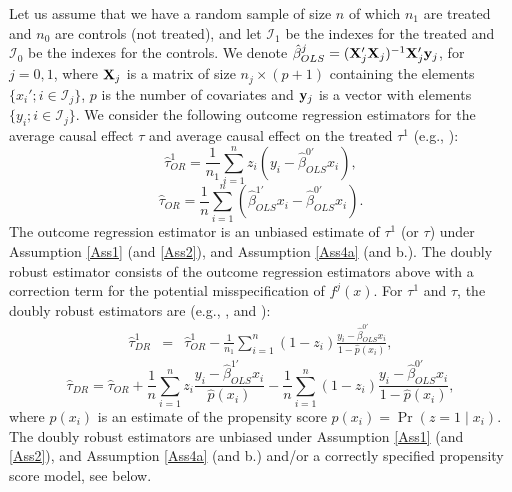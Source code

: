 \documentclass[11pt]{article}
\newcommand{\X}{{\bf X}}
\newcommand{\y}{{\bf y}}
\begin{document}
 Let us assume that we have a random sample of size $n$ of which $n_1$ are treated and $n_0$ are controls (not treated), and let $\mathcal{I}_1$ be the indexes for the treated and $\mathcal{I}_0$ be the indexes for the controls. We denote $\hat\beta^j_{OLS}=(\X_j'\X_j)^{-1}\X_j' \y_j$, for $j=0,1$, where $\X_j$ is a matrix of size $n_j \times (p+1)$ containing the elements $\{x_i' ; i \in \mathcal{I}_j\} $, $p$ is the number of covariates and $\y_j$ is a vector with elements $\{y_i ; i \in \mathcal{I}_j\}$. We consider the following outcome regression estimators for the average causal effect  $\tau$ and average causal effect on the treated $\tau^1$ (e.g., \citealp{Tan:2007}):
 \begin{equation}
\hat\tau^1_{OR} = \frac{1}{n_1}\sum \limits_{i =1}^n z_i\left(y_i-\hat\beta^{0'}_{OLS}x_i\right),
\end{equation}
\begin{equation}\hat\tau_{OR}=\frac{1}{n}\sum_{i=1}^{n}\left( \hat\beta^{1'}_{OLS}x_i-\hat\beta^{0'}_{OLS}x_i\right).
\end{equation}
The outcome regression estimator is an unbiased estimate of $\tau^1$ (or $\tau$) under Assumption \ref{Ass1} (and \ref{Ass2}), and Assumption \ref{Ass4a} (and b.). The doubly robust estimator consists of the outcome regression estimators above with a correction term for the potential misspecification of $f^j(x)$. For $\tau^1$ and $\tau$, the doubly robust estimators are (e.g., \citealp{SRR:99}, \citealp{Lunceford:2004} and \citealp{RF:13}):
\begin{eqnarray}\label{DR1.eq}
\hat{\tau}^1_{DR}&=&\hat\tau^1_{OR}-\frac{1}{n_1}\sum \limits_{i =1}^n(1-z_i)\frac{y_i-\hat\beta^{0'}_{OLS}x_i}{1-\hat p(x_i)} ,
\end{eqnarray}
\begin{equation}\label{DR.eq}
\hat{\tau}_{DR}=\hat \tau_{OR}
+\frac{1}{n}\sum  \limits_{i =1}^n z_i \frac{y_i-\hat\beta^{1'}_{OLS}x_i}{\hat{p}(x_i)}
-\frac{1}{n}\sum  \limits_{i =1}^n (1-z_i)\frac{y_i-\hat\beta^{0'}_{OLS}x_i}{1-\hat{p}(x_i)},
\end{equation}
where $\hat{p}(x_i)$ is an estimate of the propensity score $p(x_i)=\Pr(z=1\mid x_i)$. The doubly robust estimators are unbiased under Assumption \ref{Ass1} (and \ref{Ass2}), and Assumption \ref{Ass4a} (and b.) and/or a correctly specified propensity score model, see below.
\end{document}
